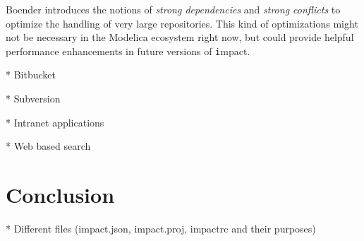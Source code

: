 \documentclass[11pt,a4paper,twocolumn]{article}
\renewcommand{\normalsize}{\fontsize{10.5pt}{12.3pt}\selectfont}
\renewcommand{\small}{\fontsize{9.5pt}{11.1pt}\selectfont}
\newcommand{\code}[1]{\texttt{#1}} %
\begin{document}
Boender introduces the notions of {\em strong dependencies} and {\em
  strong conflicts} to optimize the handling of very large
repositories.  This kind of optimizations might not be necessary in
the Modelica ecosystem right now, but could provide helpful
performance enhancements in future versions of {\code impact}.

* Bitbucket

* Subversion

* Intranet applications

* Web based search

\section{Conclusion}

* Different files (impact.json, impact.proj, impactrc and their purposes)


\small


\normalsize
\end{document}
